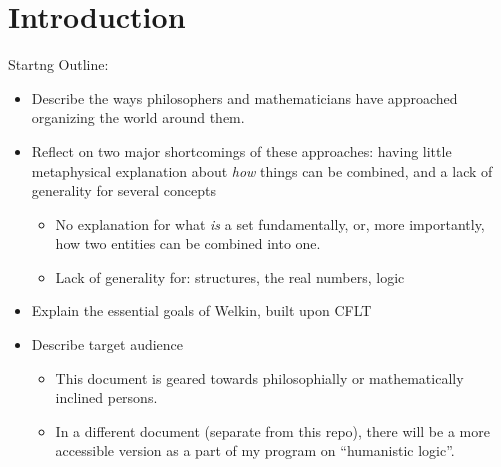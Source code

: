 

\chapter{Introduction}
\label{ch:intro}


Startng Outline:
\begin{itemize}
  \item Describe the ways philosophers and mathematicians have approached organizing the world around them.
  \item Reflect on two major shortcomings of these approaches: having little metaphysical explanation about \textit{how} things can be combined, and a lack of generality for several concepts
        \begin{itemize}
      \item No explanation for what \textit{is} a set fundamentally, or, more importantly, how two entities can be combined into one.
      \item Lack of generality for: structures, the real numbers, logic
  \end{itemize}
  \item Explain the essential goals of Welkin, built upon CFLT
  \item Describe target audience
  \begin{itemize}
    \item This document is geared towards philosophially or mathematically inclined persons.
    \item In a different document (separate from this repo), there will be a more accessible version as a part of my program on ``humanistic logic''.
  \end{itemize}
\end{itemize}
